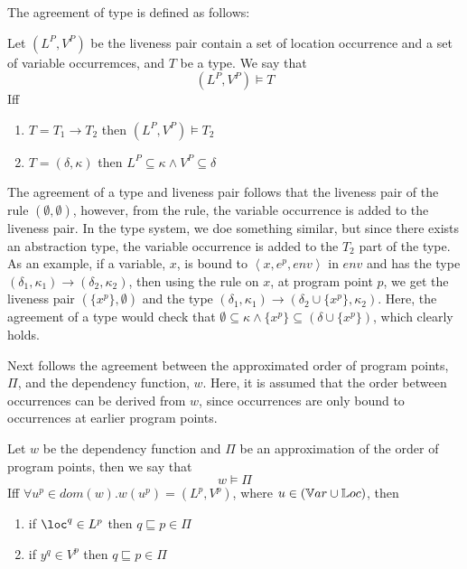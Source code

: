 \documentclass[../../master.tex]{subfiles}
\begin{document}
The agreement of type is defined as follows:

\begin{definition}
	Let $(L^P,V^P)$ be the liveness pair contain a set of location occurrence and a set of variable occurremces, and $T$ be a type.
	We say that
	$$(L^P,V^P)\models T$$
	Iff
	\begin{enumerate}
		\item $T=T_1\rightarrow T_2$ then $(L^P,V^P)\models T_2$
		\item $T=(\delta,\kappa)$ then $L^P\subseteq\kappa\wedge V^P\subseteq\delta$
	\end{enumerate}
\end{definition}
The agreement of a type and liveness pair follows that the liveness pair of the  rule $(\emptyset,\emptyset)$, however, from the  rule, the variable occurrence is added to the liveness pair.
In the type system, we doe something similar, but since there exists an abstraction type, the variable occurrence is added to the $T_2$ part of the type.
As an example, if a variable, $x$, is bound to $\left\langle x,e^p,env\right\rangle$ in $env$ and has the type $(\delta_1,\kappa_1)\rightarrow(\delta_2,\kappa_2)$, then using the  rule on $x$, at program point $p$, we get the liveness pair $(\{x^p\},\emptyset)$ and the type $(\delta_1,\kappa_1)\rightarrow(\delta_2\cup\{x^p\},\kappa_2)$.
Here, the agreement of a type would check that $\emptyset\subseteq\kappa\wedge\{x^p\}\subseteq(\delta\cup\{x^p\})$, which clearly holds.

Next follows the agreement between the approximated order of program points, $\Pi$, and the dependency function, $w$.
Here, it is assumed that the order between occurrences can be derived from $w$, since occurrences are only bound to occurrences at earlier program points.

\begin{definition}
	Let $w$ be the dependency function and $\Pi$ be an approximation of the order of program points, then we say that
	$$w\models\Pi$$
	Iff $\forall u^p\in dom(w).w(u^p)=(L^p,V^p)$, where $u\in(\mathbb{V}ar\cup\mathbb{L}oc)$, then
	\begin{enumerate}
		\item if $\loc^q\in L^p$ then $q\sqsubseteq p\in\Pi$
		\item if $y^q\in V^p$ then $q\sqsubseteq p\in\Pi$
	\end{enumerate}
\end{definition}
\end{document}
